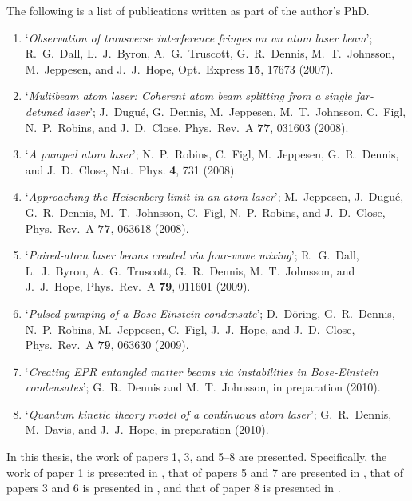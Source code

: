 \parasep

The following is a list of publications written as part of the author's PhD.
\begin{enumerate}
    \item `\emph{Observation of transverse interference fringes on an atom laser beam}'; R.~G.~Dall, L.~J.~Byron, A.~G.~Truscott, G.~R.~Dennis, M.~T.~Johnsson, M.~Jeppesen, and J.~J.~Hope, Opt.~Express \textbf{15}, 17673 (2007).
    \item `\emph{Multibeam atom laser: Coherent atom beam splitting from a single far-detuned laser}'; J.~Dugué, G.~Dennis, M.~Jeppesen, M.~T.~Johnsson, C.~Figl, N.~P.~Robins, and J.~D.~Close, Phys.~Rev.~A \textbf{77}, 031603 (2008).
    \item `\emph{A pumped atom laser}'; N.~P.~Robins, C.~Figl, M.~Jeppesen, G.~R.~Dennis, and J.~D.~Close, Nat.~Phys. \textbf{4}, 731 (2008).
    \item `\emph{Approaching the Heisenberg limit in an atom laser}'; M.~Jeppesen, J.~Dugué, G.~R.~Dennis, M.~T.~Johnsson, C.~Figl, N.~P.~Robins, and J.~D.~Close, Phys.~Rev.~A \textbf{77}, 063618 (2008).
    \item `\emph{Paired-atom laser beams created via four-wave mixing}'; R.~G.~Dall, L.~J.~Byron, A.~G.~Truscott, G.~R.~Dennis, M.~T.~Johnsson, and J.~J.~Hope, Phys.~Rev.~A \textbf{79}, 011601 (2009).
    \item `\emph{Pulsed pumping of a Bose-Einstein condensate}'; D.~Döring, G.~R.~Dennis, N.~P.~Robins, M.~Jeppesen, C.~Figl, J.~J.~Hope, and J.~D.~Close, Phys.~Rev.~A \textbf{79}, 063630 (2009).
    \item `\emph{Creating EPR entangled matter beams via instabilities in Bose-Einstein condensates}'; G.~R.~Dennis and M.~T.~Johnsson, in preparation (2010).
    \item `\emph{Quantum kinetic theory model of a continuous atom laser}'; G.~R.~Dennis, M.~Davis, and J.~J.~Hope, in preparation (2010).
\end{enumerate}
In this thesis, the work of papers 1, 3, and 5--8 are presented.  Specifically, the work of paper 1 is presented in , that of papers 5 and 7 are presented in , that of papers 3 and 6 is presented in , and that of paper 8 is presented in .
